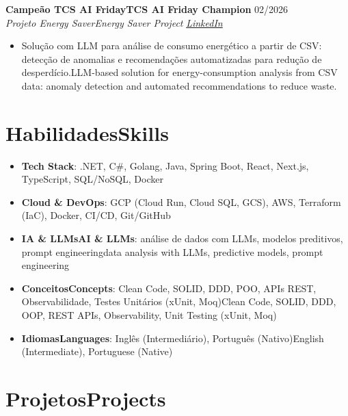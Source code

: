 \documentclass[a4paper,10pt]{article}
\newcommand{\tr}[2]{\ifdefined\CVPT #2\else #1\fi}
\newcommand{\entry}[4]{
  \noindent\textbf{#1} \hfill #2 \\
  \noindent\textit{#3} \hfill \textit{#4} \\
  \vspace{2pt}
}
\begin{document}
\entry{\tr{TCS AI Friday Champion}{Campeão TCS AI Friday}}{02/2026}{\tr{Energy Saver Project}{Projeto Energy Saver}}{\href{https://www.linkedin.com/posts/marcosh0wzy_ai-llm-dataanalysis-activity-7439643718057385985--a7G}{\faLink \space LinkedIn}}
\vspace{-0.4em}
\begin{itemize}[leftmargin=*, itemsep=2pt]
\setlength\itemsep{0em}
\item \tr{LLM-based solution for energy-consumption analysis from CSV data: anomaly detection and automated recommendations to reduce waste.}{Solução com LLM para análise de consumo energético a partir de CSV: detecção de anomalias e recomendações automatizadas para redução de desperdício.}
\end{itemize}

\section*{\tr{Skills}{Habilidades}}

\begin{itemize}[leftmargin=*, itemsep=2pt]
\setlength\itemsep{0em}
\item \textbf{Tech Stack}: .NET, C\#, Golang, Java, Spring Boot, React, Next.js, TypeScript, SQL/NoSQL, Docker
\item \textbf{Cloud \& DevOps}: GCP (Cloud Run, Cloud SQL, GCS), AWS, Terraform (IaC), Docker, CI/CD, Git/GitHub
\item \textbf{\tr{AI \& LLMs}{IA \& LLMs}}: \tr{data analysis with LLMs, predictive models, prompt engineering}{análise de dados com LLMs, modelos preditivos, prompt engineering}
\item \textbf{\tr{Concepts}{Conceitos}}: \tr{Clean Code, SOLID, DDD, OOP, REST APIs, Observability, Unit Testing (xUnit, Moq)}{Clean Code, SOLID, DDD, POO, APIs REST, Observabilidade, Testes Unitários (xUnit, Moq)}
\item \textbf{\tr{Languages}{Idiomas}}: \tr{English (Intermediate), Portuguese (Native)}{Inglês (Intermediário), Português (Nativo)}
\end{itemize}

\section*{\tr{Projects}{Projetos}}
\end{document}
